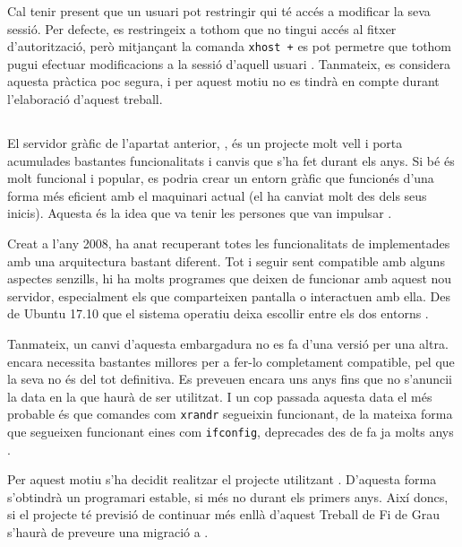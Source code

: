 Cal tenir present que un usuari pot restringir qui té accés a modificar la
seva sessió. Per defecte, es restringeix a tothom que no tingui accés al
fitxer d'autorització, però mitjançant la comanda \verb|xhost +| es pot permetre
que tothom pugui efectuar modificacions a la sessió d'aquell usuari \cite{xhost}.
Tanmateix, es considera aquesta pràctica poc segura, i per aquest motiu no es
tindrà en compte durant l'elaboració d'aquest treball.

\subsection{}
\label{subsec:wayland}

El servidor gràfic de l'apartat anterior, , és un projecte molt vell
i porta acumulades bastantes funcionalitats i canvis que s'ha fet durant els
anys. Si bé és molt funcional i popular, es podria crear un entorn gràfic que
funcionés d'una forma més eficient amb el maquinari actual (el 
ha canviat molt des dels seus inicis). Aquesta és la idea que va tenir les
persones que van impulsar .

Creat a l'any 2008, ha anat recuperant totes les funcionalitats de 
implementades amb una arquitectura bastant diferent. Tot i seguir sent
compatible amb alguns aspectes senzills, hi ha molts programes que deixen de
funcionar amb aquest nou servidor, especialment els que comparteixen pantalla
o interactuen amb ella. Des de Ubuntu 17.10 que el sistema operatiu deixa
escollir entre els dos entorns \cite{Wayland}.

Tanmateix, un canvi d'aquesta embargadura no es fa d'una versió per una altra.
 encara necessita bastantes millores per a fer-lo completament
compatible, pel que la seva  no és del tot definitiva. Es preveuen
encara uns anys fins que no s'anuncii la data en la que  haurà de
ser utilitzat. I un cop passada aquesta data el més probable és que comandes
com \verb|xrandr| segueixin funcionant, de la mateixa forma que segueixen
funcionant eines com \verb|ifconfig|, deprecades des de fa ja molts anys
\cite{Ifconfig}.

Per aquest motiu s'ha decidit realitzar el projecte utilitzant .
D'aquesta forma s'obtindrà un programari estable, si més no durant els primers
anys. Així doncs, si el projecte té previsió de continuar més enllà d'aquest
Treball de Fi de Grau s'haurà de preveure una migració a .
